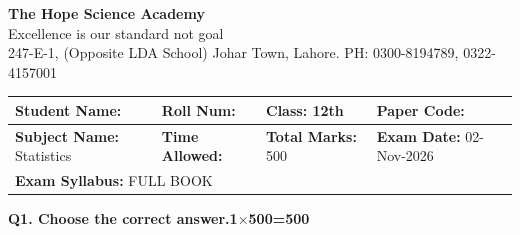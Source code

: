 \documentclass[11pt,a4paper]{article}
\begin{document}
\begin{center}
  {\Huge\bfseries The Hope Science Academy}\\[3pt]
  {\small Excellence is our standard not goal}\\[2pt]
  {\small 247-E-1, (Opposite LDA School) Johar Town, Lahore. PH: 0300-8194789, 0322-4157001}
\end{center}

\medskip
\noindent
\begin{tabularx}{\linewidth}{|X|X|X|X|}
\hline
\textbf{Student Name:} & \textbf{Roll Num:} & \textbf{Class:} 12th & \textbf{Paper Code:} \\ \hline
\textbf{Subject Name:} Statistics & \textbf{Time Allowed:} & \textbf{Total Marks:} 500 & \textbf{Exam Date:} 02-Nov-2026 \\ \hline
\multicolumn{4}{|l|}{\textbf{Exam Syllabus:} FULL BOOK} \\ \hline
\end{tabularx}

\bigskip
\noindent\textbf{Q1. Choose the correct answer.}\hfill\textbf{1$\times$500=500}
\end{document}
